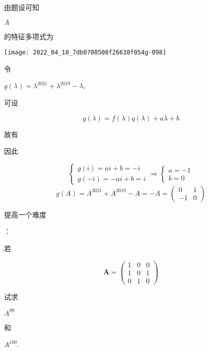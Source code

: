 \documentclass[10pt]{article}
\begin{document}
\begin{CJK}{UTF8}{mj}由题设可知\end{CJK} $A$ \begin{CJK}{UTF8}{mj}的特征多项式为\end{CJK}

\texttt{[image: 2022\_04\_18\_7db0708508f26638f054g-098]}

\begin{CJK}{UTF8}{mj}令\end{CJK} $g(\lambda)=\lambda^{2021}+\lambda^{2019}-\lambda$, \begin{CJK}{UTF8}{mj}可设\end{CJK}
$$
g(\lambda)=f(\lambda) q(\lambda)+a \lambda+b
$$
\begin{CJK}{UTF8}{mj}故有\end{CJK}

\begin{CJK}{UTF8}{mj}因此\end{CJK}
$$
\left\{\begin{array} { l } 
{ g ( i ) = a i + b = - i } \\
{ g ( - i ) = - a i + b = i }
\end{array} \Rightarrow \left\{\begin{array}{l}
a=-1 \\
b=0
\end{array}\right.\right.
$$
$$
g(A)=A^{2021}+A^{2019}-A=-A=\left(\begin{array}{cc}
0 & 1 \\
-1 & 0
\end{array}\right)
$$
\begin{CJK}{UTF8}{mj}提高一个难度\end{CJK}：\begin{CJK}{UTF8}{mj}若\end{CJK}
$$
\boldsymbol{A}=\left(\begin{array}{lll}
1 & 0 & 0 \\
1 & 0 & 1 \\
0 & 1 & 0
\end{array}\right)
$$
\begin{CJK}{UTF8}{mj}试求\end{CJK} $A^{99}$ \begin{CJK}{UTF8}{mj}和\end{CJK} $A^{100}$.
\end{document}
